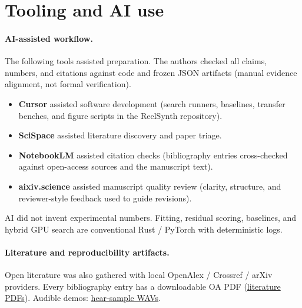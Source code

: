 \section{Tooling and AI use}
\label{sec:tooling}

\paragraph{AI-assisted workflow.}
The following tools assisted preparation.
The authors checked all claims, numbers, and citations against code and frozen JSON artifacts (manual evidence alignment, not formal verification).
\begin{itemize}
  \item \textbf{Cursor} assisted software development (search runners, baselines, transfer benches, and figure scripts in the ReelSynth repository).
  \item \textbf{SciSpace} assisted literature discovery and paper triage.
  \item \textbf{NotebookLM} assisted citation checks (bibliography entries cross-checked against open-access sources and the manuscript text).
  \item \textbf{aixiv.science} assisted manuscript quality review (clarity, structure, and reviewer-style feedback used to guide revisions).
\end{itemize}
AI did not invent experimental numbers.
Fitting, residual scoring, baselines, and hybrid GPU search are conventional Rust / PyTorch with deterministic logs.

\paragraph{Literature and reproducibility artifacts.}
Open literature was also gathered with local OpenAlex / Crossref / arXiv providers. Every bibliography entry has a downloadable OA PDF
(\href{https://github.com/reeldemo/denoise-opt-meta/tree/master/artifacts/literature_oa/pdfs}{literature PDFs}).
Audible demos:
\href{https://github.com/reeldemo/reelsynth/tree/main/brand/artifacts/meta_approach_compare/hear_samples}{hear-sample WAVs}.
